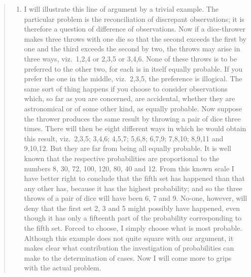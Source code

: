 \documentclass[
]{article}
\providecommand{\tightlist}{%
  \setlength{\itemsep}{0pt}\setlength{\parskip}{0pt}}
\begin{document}
\begin{quote}
\begin{enumerate}
\def\labelenumi{\arabic{enumi}.}
\setcounter{enumi}{8}
\tightlist
\item
  I will illustrate this line of argument by a trivial example. The
  particular problem is the reconciliation of discrepant observations;
  it is therefore a question of difference of observations. Now if a
  dice-thrower makes three throws with one die so that the second
  exceeds the first by one and the third exceeds the second by two, the
  throws may arise in three ways, viz.~1,2,4 or 2,3,5 or 3,4,6. None of
  these throws is to be preferred to the other two, for each is in
  itself equally probable. If you prefer the one in the middle,
  viz.~2,3,5, the preference is illogical. The same sort of thing
  happens if you choose to consider observations which, so far as you
  are concerned, are accidental, whether they are astronomical or of
  some other kind, as equally probable. Now suppose the thrower produces
  the same result by throwing a pair of dice three times. There will
  then be eight different ways in which he would obtain this result,
  viz.~2,3,5; 3,4,6; 4,5,7; 5,6,8; 6,7,9; 7,8,10; 8,9,11 and 9,10,12.
  But they are far from being all equally probable. It is well known
  that the respective probabilities are proportional to the numbers 8,
  30, 72, 100, 120, 80, 40 and 12. From this known scale I have better
  right to conclude that the fifth set has happened than that any other
  has, because it has the highest probability; and so the three throws
  of a pair of dice will have been 6, 7 and 9. No-one, however, will
  deny that the first set 2, 3 and 5 might possibly have happened, even
  though it has only a fifteenth part of the probability corresponding
  to the fifth set. Forced to choose, I simply choose what is most
  probable. Although this example does not quite square with our
  argument, it makes clear what contribution the investigation of
  probabilities can make to the determination of cases. Now I will come
  more to grips with the actual problem.
\end{enumerate}
\end{quote}
\end{document}
